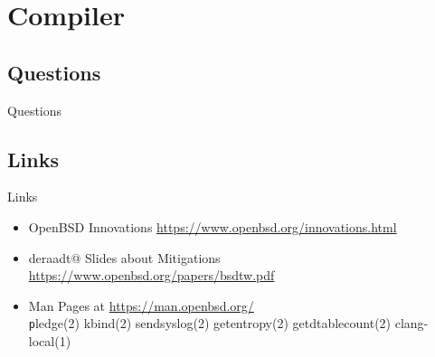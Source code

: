 \documentclass[14pt]{beamer}
\begin{document}
\section{Compiler}

\subsection{Questions}
\begin{frame}{Questions}
\begin{center}
\end{center}
\end{frame}

\subsection{Links}
\begin{frame}{Links}
\begin{itemize}
    \item OpenBSD Innovations
	{\small \url{https://www.openbsd.org/innovations.html}}
    \item deraadt@ Slides about Mitigations
	{\small \url{https://www.openbsd.org/papers/bsdtw.pdf}}
    \item Man Pages at {\small \url{https://man.openbsd.org/}}\\
	\texttt
	pledge(2)
	kbind(2)
	sendsyslog(2)
	getentropy(2)
	getdtablecount(2)
	clang-local(1)
\end{itemize}
\end{frame}
\end{document}
